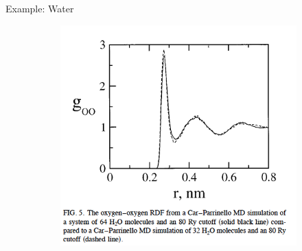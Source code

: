 \documentclass[aspectratio=169]{beamer}
\begin{document}
    \begin{frame}{Example: Water}
        \begin{figure}
            \centering
            \begin{subfigure}{0.45\textwidth}
                \centering
                \includegraphics[width=\linewidth]{lectures/figures/13-H2O_1.png}
            \end{subfigure}
            \begin{subfigure}{0.2\textwidth}
                \centering

\end{subfigure}
\end{figure}
\end{frame}
\end{document}
